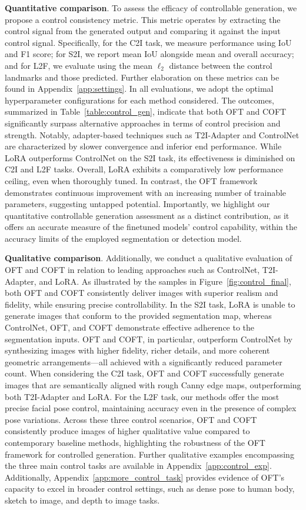 \textbf{Quantitative comparison}. To assess the efficacy of controllable generation, we propose a control consistency metric. This metric operates by extracting the control signal from the generated output and comparing it against the input control signal. Specifically, for the C2I task, we measure performance using IoU and F1 score; for S2I, we report mean IoU alongside mean and overall accuracy; and for L2F, we evaluate using the mean $\ell_2$ distance between the control landmarks and those predicted. Further elaboration on these metrics can be found in Appendix~\ref{app:settings}. In all evaluations, we adopt the optimal hyperparameter configurations for each method considered. The outcomes, summarized in Table~\ref{table:control_gen}, indicate that both OFT and COFT significantly surpass alternative approaches in terms of control precision and strength. Notably, adapter-based techniques such as T2I-Adapter and ControlNet are characterized by slower convergence and inferior end performance. While LoRA outperforms ControlNet on the S2I task, its effectiveness is diminished on C2I and L2F tasks. Overall, LoRA exhibits a comparatively low performance ceiling, even when thoroughly tuned. In contrast, the OFT framework demonstrates continuous improvement with an increasing number of trainable parameters, suggesting untapped potential. Importantly, we highlight our quantitative controllable generation assessment as a distinct contribution, as it offers an accurate measure of the finetuned models' control capability, within the accuracy limits of the employed segmentation or detection model.

\textbf{Qualitative comparison}. Additionally, we conduct a qualitative evaluation of OFT and COFT in relation to leading approaches such as ControlNet, T2I-Adapter, and LoRA. As illustrated by the samples in Figure~\ref{fig:control_final}, both OFT and COFT consistently deliver images with superior realism and fidelity, while ensuring precise controllability. In the S2I task, LoRA is unable to generate images that conform to the provided segmentation map, whereas ControlNet, OFT, and COFT demonstrate effective adherence to the segmentation inputs. OFT and COFT, in particular, outperform ControlNet by synthesizing images with higher fidelity, richer details, and more coherent geometric arrangements—all achieved with a significantly reduced parameter count. When considering the C2I task, OFT and COFT successfully generate images that are semantically aligned with rough Canny edge maps, outperforming both T2I-Adapter and LoRA. For the L2F task, our methods offer the most precise facial pose control, maintaining accuracy even in the presence of complex pose variations. Across these three control scenarios, OFT and COFT consistently produce images of higher qualitative value compared to contemporary baseline methods, highlighting the robustness of the OFT framework for controlled generation. Further qualitative examples encompassing the three main control tasks are available in Appendix~\ref{app:control_exp}. Additionally, Appendix~\ref{app:more_control_task} provides evidence of OFT’s capacity to excel in broader control settings, such as dense pose to human body, sketch to image, and depth to image tasks.

